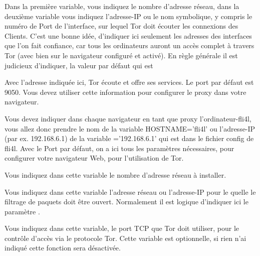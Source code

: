 \begin{description}


        {Dans la première variable, vous indiquez le nombre d'adresse réseau,
        dans la deuxième variable vous indiquez l'adresse-IP ou le nom symbolique,
        y compris le numéro de Port de l'interface, sur lequel Tor doit écouter
        les connexions des Clients. C'est une bonne idée, d'indiquer ici seulement
        les adresses des interfaces que l'on fait confiance, car tous les
        ordinateurs auront un accès complet à travers Tor (avec bien sur le
        navigateur configuré et activé). En règle générale il est judicieux
        d'indiquer, la valeur par défaut qui est 

        Avec l'adresse indiquée ici, Tor écoute et offre ses services. Le port
        par défaut est 9050. Vous devez utiliser cette information pour
        configurer le proxy dans votre navigateur.

        Vous devez indiquer dans chaque navigateur en tant que proxy
        l'ordinateur-fli4l, vous allez donc prendre le nom de la variable
        HOSTNAME='fli4l' ou l'adresse-IP (par ex. 192.168.6.1) de la variable
        ='192.168.6.1' qui est dans le fichier config de
        fli4l. Avec le Port par défaut, on a ici tous les paramètres nécessaires,
        pour configurer votre navigateur Web, pour l'utilisation de Tor.}


        {Vous indiquez dans cette variable le nombre d'adresse réseau à installer.}


        Vous indiquez dans cette variable l'adresse réseau ou l'adresse-IP pour
        le quelle le filtrage de paquets doit être ouvert. Normalement il est
        logique d'indiquer ici le paramètre .


        Vous indiquez dans cette variable, le port TCP que Tor doit utiliser,
        pour le contrôle d'accès via le protocole Tor. Cette variable
        est optionnelle, si rien n'ai indiqué cette fonction sera désactivée.



\end{description}
